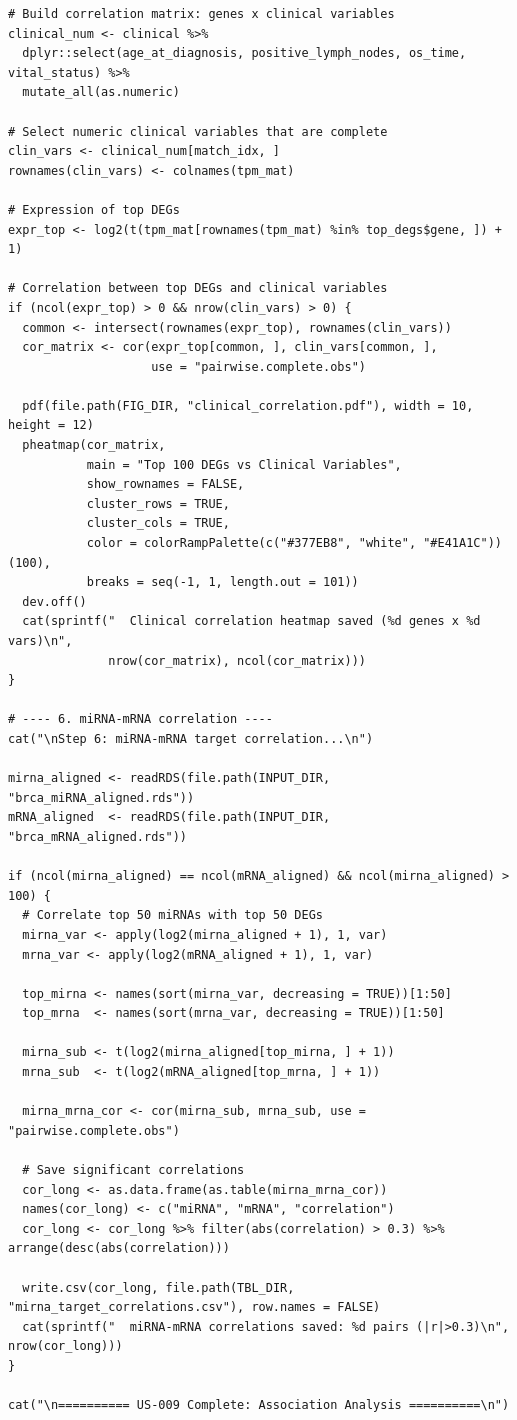 \documentclass[12pt,a4paper]{ctexart}
\begin{document}
\begin{lstlisting}[caption={07_association_analysis}, basicstyle=\ttfamily\scriptsize]
# Build correlation matrix: genes x clinical variables
clinical_num <- clinical %>%
  dplyr::select(age_at_diagnosis, positive_lymph_nodes, os_time, vital_status) %>%
  mutate_all(as.numeric)

# Select numeric clinical variables that are complete
clin_vars <- clinical_num[match_idx, ]
rownames(clin_vars) <- colnames(tpm_mat)

# Expression of top DEGs
expr_top <- log2(t(tpm_mat[rownames(tpm_mat) %in% top_degs$gene, ]) + 1)

# Correlation between top DEGs and clinical variables
if (ncol(expr_top) > 0 && nrow(clin_vars) > 0) {
  common <- intersect(rownames(expr_top), rownames(clin_vars))
  cor_matrix <- cor(expr_top[common, ], clin_vars[common, ],
                    use = "pairwise.complete.obs")

  pdf(file.path(FIG_DIR, "clinical_correlation.pdf"), width = 10, height = 12)
  pheatmap(cor_matrix,
           main = "Top 100 DEGs vs Clinical Variables",
           show_rownames = FALSE,
           cluster_rows = TRUE,
           cluster_cols = TRUE,
           color = colorRampPalette(c("#377EB8", "white", "#E41A1C"))(100),
           breaks = seq(-1, 1, length.out = 101))
  dev.off()
  cat(sprintf("  Clinical correlation heatmap saved (%d genes x %d vars)\n",
              nrow(cor_matrix), ncol(cor_matrix)))
}

# ---- 6. miRNA-mRNA correlation ----
cat("\nStep 6: miRNA-mRNA target correlation...\n")

mirna_aligned <- readRDS(file.path(INPUT_DIR, "brca_miRNA_aligned.rds"))
mRNA_aligned  <- readRDS(file.path(INPUT_DIR, "brca_mRNA_aligned.rds"))

if (ncol(mirna_aligned) == ncol(mRNA_aligned) && ncol(mirna_aligned) > 100) {
  # Correlate top 50 miRNAs with top 50 DEGs
  mirna_var <- apply(log2(mirna_aligned + 1), 1, var)
  mrna_var <- apply(log2(mRNA_aligned + 1), 1, var)

  top_mirna <- names(sort(mirna_var, decreasing = TRUE))[1:50]
  top_mrna  <- names(sort(mrna_var, decreasing = TRUE))[1:50]

  mirna_sub <- t(log2(mirna_aligned[top_mirna, ] + 1))
  mrna_sub  <- t(log2(mRNA_aligned[top_mrna, ] + 1))

  mirna_mrna_cor <- cor(mirna_sub, mrna_sub, use = "pairwise.complete.obs")

  # Save significant correlations
  cor_long <- as.data.frame(as.table(mirna_mrna_cor))
  names(cor_long) <- c("miRNA", "mRNA", "correlation")
  cor_long <- cor_long %>% filter(abs(correlation) > 0.3) %>% arrange(desc(abs(correlation)))

  write.csv(cor_long, file.path(TBL_DIR, "mirna_target_correlations.csv"), row.names = FALSE)
  cat(sprintf("  miRNA-mRNA correlations saved: %d pairs (|r|>0.3)\n", nrow(cor_long)))
}

cat("\n========== US-009 Complete: Association Analysis ==========\n")
\end{lstlisting}
\end{document}
